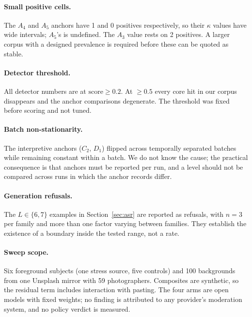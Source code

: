 \documentclass[11pt]{article}
\begin{document}
\paragraph{Small positive cells.} The $A_4$ and $A_5$ anchors have 1 and 0 positives respectively, so their $\kappa$ values have wide intervals; $A_5$'s is undefined. The $A_3$ value rests on 2 positives. A larger corpus with a designed prevalence is required before these can be quoted as stable.

\paragraph{Detector threshold.} All detector numbers are at $\text{score}\ge0.2$. At $\ge0.5$ every core hit in our corpus disappears and the anchor comparisons degenerate. The threshold was fixed before scoring and not tuned.

\paragraph{Batch non-stationarity.} The interpretive anchors ($C_2$, $D_1$) flipped across temporally separated batches while remaining constant within a batch. We do not know the cause; the practical consequence is that anchors must be reported per run, and a level should not be compared across runs in which the anchor records differ.

\paragraph{Generation refusals.} The $L\in\{6,7\}$ examples in Section~\ref{sec:asr} are reported as refusals, with $n=3$ per family and more than one factor varying between families. They establish the existence of a boundary inside the tested range, not a rate.

\paragraph{Sweep scope.} Six foreground subjects (one stress source, five controls) and 100 backgrounds from one Unsplash mirror with 59 photographers. Composites are synthetic, so the residual term includes interaction with pasting. The four arms are open models with fixed weights; no finding is attributed to any provider's moderation system, and no policy verdict is measured.
\end{document}
